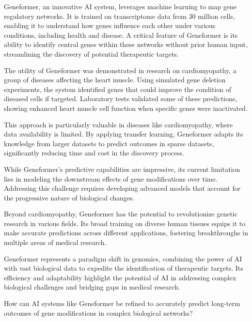 \documentclass[12pt]{article}
\begin{document}
 
Geneformer, an innovative AI system, leverages machine learning to map gene regulatory networks. It is trained on transcriptome data from 30 million cells, enabling it to understand how genes influence each other under various conditions, including health and disease. A critical feature of Geneformer is its ability to identify central genes within these networks without prior human input, streamlining the discovery of potential therapeutic targets.  

 
The utility of Geneformer was demonstrated in research on cardiomyopathy, a group of diseases affecting the heart muscle. Using simulated gene deletion experiments, the system identified genes that could improve the condition of diseased cells if targeted. Laboratory tests validated some of these predictions, showing enhanced heart muscle cell function when specific genes were inactivated.  

This approach is particularly valuable in diseases like cardiomyopathy, where data availability is limited. By applying transfer learning, Geneformer adapts its knowledge from larger datasets to predict outcomes in sparse datasets, significantly reducing time and cost in the discovery process.  

 
While Geneformer’s predictive capabilities are impressive, its current limitation lies in modeling the downstream effects of gene modifications over time. Addressing this challenge requires developing advanced models that account for the progressive nature of biological changes.  

 
Beyond cardiomyopathy, Geneformer has the potential to revolutionize genetic research in various fields. Its broad training on diverse human tissues equips it to make accurate predictions across different applications, fostering breakthroughs in multiple areas of medical research.  


Geneformer represents a paradigm shift in genomics, combining the power of AI with vast biological data to expedite the identification of therapeutic targets. Its efficiency and adaptability highlight the potential of AI in addressing complex biological challenges and bridging gaps in medical research.  

How can AI systems like Geneformer be refined to accurately predict long-term outcomes of gene modifications in complex biological networks?

\newpage
\end{document}

